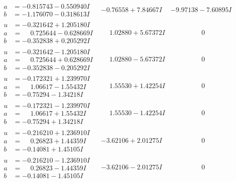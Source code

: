 \documentclass[1p]{elsarticle_modified}
\theoremstyle{definition}
\begin{document}
$$\begin{array}{c|c|c}
\begin{aligned}
a &= -0.815743 - 0.550940 I \\
b &= -1.176070 - 0.318613 I\end{aligned}
 & -0.76558 + 7.84667 I & -9.97138 - 7.60895 I \\ \hline\begin{aligned}
u &= -0.321642 + 1.205180 I \\
a &= \phantom{-}0.725644 - 0.628669 I \\
b &= -0.352838 + 0.205292 I\end{aligned}
 & \phantom{-}1.02880 + 5.67372 I & \phantom{-0.000000 } 0 \\ \hline\begin{aligned}
u &= -0.321642 - 1.205180 I \\
a &= \phantom{-}0.725644 + 0.628669 I \\
b &= -0.352838 - 0.205292 I\end{aligned}
 & \phantom{-}1.02880 - 5.67372 I & \phantom{-0.000000 } 0 \\ \hline\begin{aligned}
u &= -0.172321 + 1.239970 I \\
a &= \phantom{-}1.06617 - 1.55432 I \\
b &= -0.75294 - 1.34218 I\end{aligned}
 & \phantom{-}1.55530 + 1.42254 I & \phantom{-0.000000 } 0 \\ \hline\begin{aligned}
u &= -0.172321 - 1.239970 I \\
a &= \phantom{-}1.06617 + 1.55432 I \\
b &= -0.75294 + 1.34218 I\end{aligned}
 & \phantom{-}1.55530 - 1.42254 I & \phantom{-0.000000 } 0 \\ \hline\begin{aligned}
u &= -0.216210 + 1.236910 I \\
a &= \phantom{-}0.26823 + 1.44359 I \\
b &= -0.14081 + 1.45105 I\end{aligned}
 & -3.62106 + 2.01275 I & \phantom{-0.000000 } 0 \\ \hline\begin{aligned}
u &= -0.216210 - 1.236910 I \\
a &= \phantom{-}0.26823 - 1.44359 I \\
b &= -0.14081 - 1.45105 I\end{aligned}
 & -3.62106 - 2.01275 I & \phantom{-0.000000 } 0 \\ \hline\begin{aligned}

\end{aligned}
\end{array}$$
\end{document}
